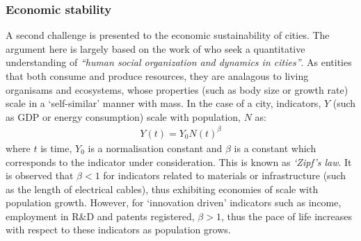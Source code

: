 \subsubsection*{Economic stability}
A second challenge is presented to the economic sustainability of cities. The argument here is largely based on the work of \citet{Bettencourt2007} who seek a quantitative understanding of \emph{``human social organization and dynamics in cities''}. As entities that both consume and produce resources, they are analagous to living organisams and ecosystems, whose properties (such as body size or growth rate) scale in a `self-similar' manner with mass. In the case of a city, indicators, $Y$ (such as GDP or energy consumption) scale with population, $N$ as:
\begin{align} \label{eq:urban_scale}
	Y(t)=Y_0N(t)^{\beta}
\end{align}
where $t$ is time, $Y_0$ is a normalisation constant and $\beta$ is a constant which corresponds to the indicator under consideration. This is known as \emph{`Zipf's law}. It is observed that $\beta<1$ for indicators related to materials or infrastructure (such as the length of electrical cables), thus exhibiting economies of scale with population growth. However, for `innovation driven' indicators such as income, employment in R\&D and patents registered, $\beta>1$, thus the pace of life increases with respect to these indicators as population grows. %

